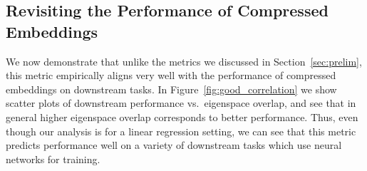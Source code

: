 
\subsection{Revisiting the Performance of Compressed Embeddings}
\label{subsec:revisit}
We now demonstrate that unlike the metrics we discussed in Section~\ref{sec:prelim}, this metric empirically aligns very well with the performance of compressed embeddings on downstream tasks.
In Figure~\ref{fig:good_correlation} we show scatter plots of downstream performance vs.\ eigenspace overlap, and see that in general higher eigenspace overlap corresponds to better performance.
Thus, even though our analysis is for a linear regression setting, we can see that this metric predicts performance well on a variety of downstream tasks which use neural networks for training.
